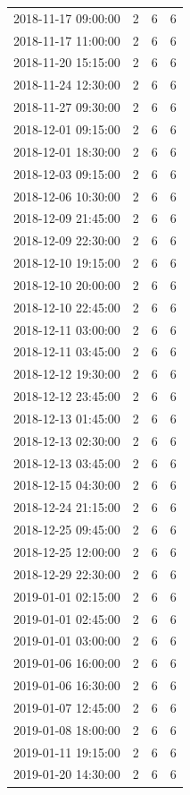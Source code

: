 \begin{tabular}{lrrr}
2018-11-17 09:00:00 & 2 & 6 & 6 \\
2018-11-17 11:00:00 & 2 & 6 & 6 \\
2018-11-20 15:15:00 & 2 & 6 & 6 \\
2018-11-24 12:30:00 & 2 & 6 & 6 \\
2018-11-27 09:30:00 & 2 & 6 & 6 \\
2018-12-01 09:15:00 & 2 & 6 & 6 \\
2018-12-01 18:30:00 & 2 & 6 & 6 \\
2018-12-03 09:15:00 & 2 & 6 & 6 \\
2018-12-06 10:30:00 & 2 & 6 & 6 \\
2018-12-09 21:45:00 & 2 & 6 & 6 \\
2018-12-09 22:30:00 & 2 & 6 & 6 \\
2018-12-10 19:15:00 & 2 & 6 & 6 \\
2018-12-10 20:00:00 & 2 & 6 & 6 \\
2018-12-10 22:45:00 & 2 & 6 & 6 \\
2018-12-11 03:00:00 & 2 & 6 & 6 \\
2018-12-11 03:45:00 & 2 & 6 & 6 \\
2018-12-12 19:30:00 & 2 & 6 & 6 \\
2018-12-12 23:45:00 & 2 & 6 & 6 \\
2018-12-13 01:45:00 & 2 & 6 & 6 \\
2018-12-13 02:30:00 & 2 & 6 & 6 \\
2018-12-13 03:45:00 & 2 & 6 & 6 \\
2018-12-15 04:30:00 & 2 & 6 & 6 \\
2018-12-24 21:15:00 & 2 & 6 & 6 \\
2018-12-25 09:45:00 & 2 & 6 & 6 \\
2018-12-25 12:00:00 & 2 & 6 & 6 \\
2018-12-29 22:30:00 & 2 & 6 & 6 \\
2019-01-01 02:15:00 & 2 & 6 & 6 \\
2019-01-01 02:45:00 & 2 & 6 & 6 \\
2019-01-01 03:00:00 & 2 & 6 & 6 \\
2019-01-06 16:00:00 & 2 & 6 & 6 \\
2019-01-06 16:30:00 & 2 & 6 & 6 \\
2019-01-07 12:45:00 & 2 & 6 & 6 \\
2019-01-08 18:00:00 & 2 & 6 & 6 \\
2019-01-11 19:15:00 & 2 & 6 & 6 \\
2019-01-20 14:30:00 & 2 & 6 & 6 \\

\end{tabular}
